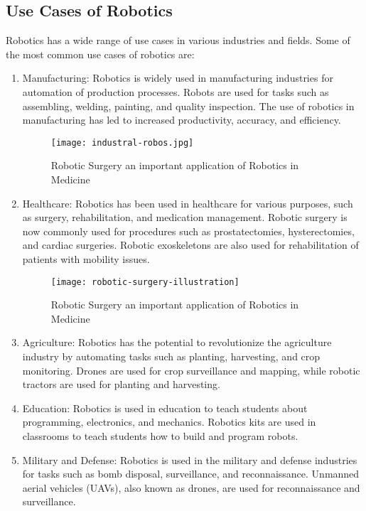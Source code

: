 \subsection{Use Cases of Robotics}
Robotics has a wide range of use cases in various industries and fields. Some of the most common use cases of robotics are:
\begin{enumerate}
    \item Manufacturing: Robotics is widely used in manufacturing industries for automation of production processes. Robots are used for tasks such as assembling, welding, painting, and quality inspection. The use of robotics in manufacturing has led to increased productivity, accuracy, and efficiency.
    
    \begin{figure}[H]
        \centering
        \texttt{[image: industral-robos.jpg]}
        \caption{Robotic Surgery an important application of Robotics in Medicine} 
    \end{figure}

    \item Healthcare: Robotics has been used in healthcare for various purposes, such as surgery, rehabilitation, and medication management. Robotic surgery is now commonly used for procedures such as prostatectomies, hysterectomies, and cardiac surgeries. Robotic exoskeletons are also used for rehabilitation of patients with mobility issues.
    
    \begin{figure}[H]
    \centering
    \texttt{[image: robotic-surgery-illustration]}
    \caption{Robotic Surgery an important application of Robotics in Medicine} 
\end{figure}

    \item Agriculture: Robotics has the potential to revolutionize the agriculture industry by automating tasks such as planting, harvesting, and crop monitoring. Drones are used for crop surveillance and mapping, while robotic tractors are used for planting and harvesting.

    \item Education: Robotics is used in education to teach students about programming, electronics, and mechanics. Robotics kits are used in classrooms to teach students how to build and program robots.

    \item Military and Defense: Robotics is used in the military and defense industries for tasks such as bomb disposal, surveillance, and reconnaissance. Unmanned aerial vehicles (UAVs), also known as drones, are used for reconnaissance and surveillance.


\end{enumerate}
